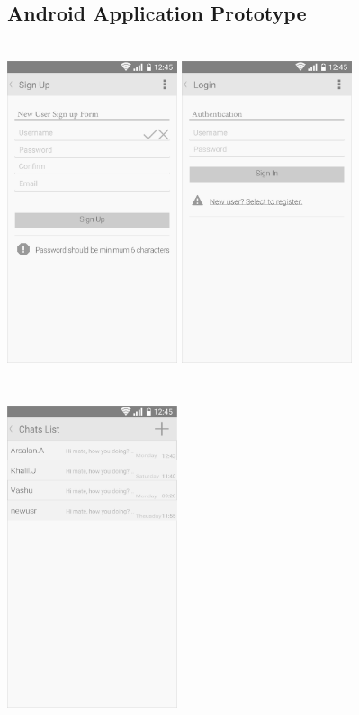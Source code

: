 \documentclass{article}
\begin{document}
\begin{appendices}
\subsection{Android Application Prototype}
\begin{center}
\includegraphics[width=5cm, height=10cm]{SignUp}
\includegraphics[width=5cm, height=10cm]{SignIn}
\includegraphics[width=5cm, height=10cm]{ChatList}

\end{center}
\end{appendices}
\end{document}
